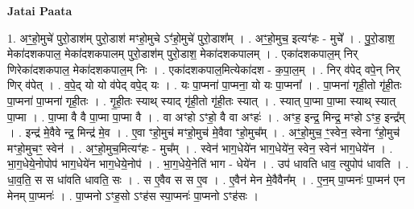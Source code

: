 \documentclass[17pt]{extarticle}
\begin{document}
\textbf{Jatai Paata} \newline

1. अꣳ॒॒हो॒मुचे॑ पुरो॒डाश॑म् पुरो॒डाश॑ मꣳहो॒मुचे ऽꣳ॑हो॒मुचे॑ पुरो॒डाश᳚म् । . अꣳ॒॒हो॒मुच॒ इत्यꣳ॑हः - मुचे᳚ । . पु॒रो॒डाश॒ मेका॑दशकपाल॒ मेका॑दशकपालम् पुरो॒डाश॑म् पुरो॒डाश॒ मेका॑दशकपालम् । . एका॑दशकपाल॒म् निर् णिरेका॑दशकपाल॒ मेका॑दशकपाल॒म् निः । . एका॑दशकपाल॒मित्येका॑दश - क॒पा॒ल॒म् । . निर् व॑पेद् वपे॒न् निर् णिर् व॑पेत् । . व॒पे॒द् यो यो व॑पेद् वपे॒द् यः । . यः पा॒प्मना॑ पा॒प्मना॒ यो यः पा॒प्मना᳚ । . पा॒प्मना॑ गृही॒तो गृ॑ही॒तः पा॒प्मना॑ पा॒प्मना॑ गृही॒तः । . गृ॒ही॒तः स्याथ् स्याद् गृ॑ही॒तो गृ॑ही॒तः स्यात् । . स्यात् पा॒प्मा पा॒प्मा स्याथ् स्यात् पा॒प्मा । . पा॒प्मा वै वै पा॒प्मा पा॒प्मा वै । . वा अꣳहो ऽꣳहो॒ वै वा अꣳहः॑ । . अꣳह॒ इन्द्र॒ मिन्द्र॒ मꣳहो ऽꣳह॒ इन्द्र᳚म् । . इन्द्र॑ मे॒वैवे न्द्र॒ मिन्द्र॑ मे॒व । . ए॒वा ꣳहो॒मुच॑ मꣳहो॒मुच॑ मे॒वैवा ꣳहो॒मुच᳚म् । . अꣳ॒॒हो॒मुच॒ ꣳ॒स्वेन॒ स्वेना ꣳ॑हो॒मुच॑ मꣳहो॒मुचꣳ॒॒ स्वेन॑ । . अꣳ॒॒हो॒मुच॒मित्यꣳ॑हः - मुच᳚म् । . स्वेन॑ भाग॒धेये॑न भाग॒धेये॑न॒ स्वेन॒ स्वेन॑ भाग॒धेये॑न । . भा॒ग॒धेये॒नोपोप॑ भाग॒धेये॑न भाग॒धेये॒नोप॑ । . भा॒ग॒धेये॒नेति॑ भाग - धेये॑न । . उप॑ धावति धाव॒ त्युपोप॑ धावति । . धा॒व॒ति॒ स स धा॑वति धावति॒ सः । . स ए॒वैव स स ए॒व । . ए॒वैन॑ मेन मे॒वैवैन᳚म् । . ए॒न॒म् पा॒प्मनः॑ पा॒प्मन॑ एन मेनम् पा॒प्मनः॑ । . पा॒प्मनो ऽꣳह॒सो ऽꣳह॑स स्पा॒प्मनः॑ पा॒प्मनो ऽꣳह॑सः । \newline
\end{document}
